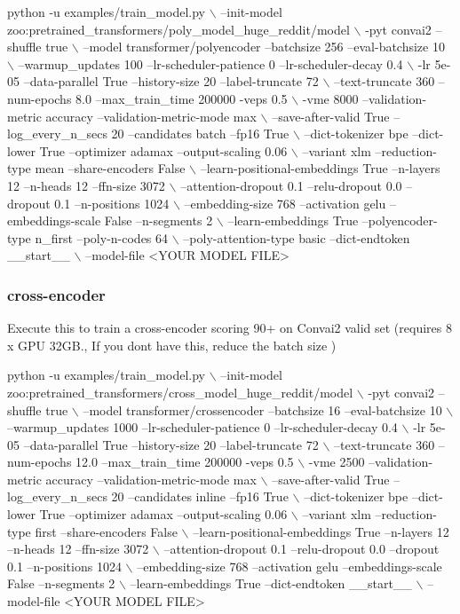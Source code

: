 \begin{DoxyCode}
python -u examples/train\_model.py \(\backslash\)
  --init-model zoo:pretrained\_transformers/poly\_model\_huge\_reddit/model \(\backslash\)
  -pyt convai2 --shuffle true \(\backslash\)
  --model transformer/polyencoder --batchsize 256 --eval-batchsize 10 \(\backslash\)
  --warmup\_updates 100 --lr-scheduler-patience 0 --lr-scheduler-decay 0.4 \(\backslash\)
  -lr 5e-05 --data-parallel True --history-size 20 --label-truncate 72 \(\backslash\)
  --text-truncate 360 --num-epochs 8.0 --max\_train\_time 200000 -veps 0.5 \(\backslash\)
  -vme 8000 --validation-metric accuracy --validation-metric-mode max \(\backslash\)
  --save-after-valid True --log\_every\_n\_secs 20 --candidates batch --fp16 True \(\backslash\)
  --dict-tokenizer bpe --dict-lower True --optimizer adamax --output-scaling 0.06 \(\backslash\)
  --variant xlm --reduction-type mean --share-encoders False \(\backslash\)
  --learn-positional-embeddings True --n-layers 12 --n-heads 12 --ffn-size 3072 \(\backslash\)
  --attention-dropout 0.1 --relu-dropout 0.0 --dropout 0.1 --n-positions 1024 \(\backslash\)
  --embedding-size 768 --activation gelu --embeddings-scale False --n-segments 2 \(\backslash\)
  --learn-embeddings True --polyencoder-type n\_first --poly-n-codes 64 \(\backslash\)
  --poly-attention-type basic --dict-endtoken \_\_start\_\_ \(\backslash\)
  --model-file <YOUR MODEL FILE>
\end{DoxyCode}


\subsubsection*{cross-\/encoder}

Execute this to train a cross-\/encoder scoring 90+ on Convai2 valid set (requires 8 x G\+PU 32\+GB., If you don\textquotesingle{}t have this, reduce the batch size )


\begin{DoxyCode}
python -u examples/train\_model.py \(\backslash\)
  --init-model zoo:pretrained\_transformers/cross\_model\_huge\_reddit/model \(\backslash\)
  -pyt convai2 --shuffle true \(\backslash\)
  --model transformer/crossencoder --batchsize 16 --eval-batchsize 10 \(\backslash\)
  --warmup\_updates 1000 --lr-scheduler-patience 0 --lr-scheduler-decay 0.4 \(\backslash\)
  -lr 5e-05 --data-parallel True --history-size 20 --label-truncate 72 \(\backslash\)
  --text-truncate 360 --num-epochs 12.0 --max\_train\_time 200000 -veps 0.5 \(\backslash\)
  -vme 2500 --validation-metric accuracy --validation-metric-mode max \(\backslash\)
  --save-after-valid True --log\_every\_n\_secs 20 --candidates inline --fp16 True \(\backslash\)
  --dict-tokenizer bpe --dict-lower True --optimizer adamax --output-scaling 0.06 \(\backslash\)
  --variant xlm --reduction-type first --share-encoders False \(\backslash\)
  --learn-positional-embeddings True --n-layers 12 --n-heads 12 --ffn-size 3072 \(\backslash\)
  --attention-dropout 0.1 --relu-dropout 0.0 --dropout 0.1 --n-positions 1024 \(\backslash\)
  --embedding-size 768 --activation gelu --embeddings-scale False --n-segments 2 \(\backslash\)
  --learn-embeddings True --dict-endtoken \_\_start\_\_ \(\backslash\)
  --model-file <YOUR MODEL FILE>
\end{DoxyCode}
 